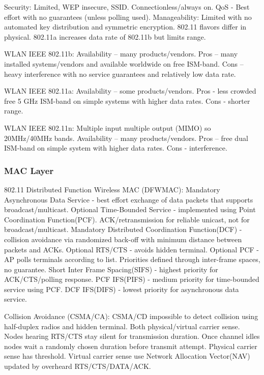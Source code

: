 \documentclass[9pt]{extarticle}
\begin{document}
\begin{multicols}{2}
Security: Limited, WEP insecure, SSID. Connectionless/always on. QoS - Best effort with no guarantees (unless polling used). Manageability: Limited with no automated key distribution and symmetric encryption. 802.11 flavors differ in physical. 802.11a increases data rate of 802.11b but limits range. 

WLAN IEEE 802.11b: Availability – many products/vendors. Pros – many installed systems/vendors and available worldwide on free ISM-band. Cons – heavy interference with no service guarantees and relatively low data rate.

WLAN IEEE 802.11a: Availability – some products/vendors. Pros - less crowded free 5 GHz ISM-band on simple systems with higher data rates. Cons - shorter range.

WLAN IEEE 802.11n: Multiple input multiple output (MIMO) so 20MHz/40MHz bands. Availability – many products/vendors. Pros – free dual ISM-band on simple system with higher data rates. Cons - interference.

\subsubsection{MAC Layer}

802.11 Distributed Function Wireless MAC (DFWMAC): Mandatory Asynchronous Data Service - best effort exchange of data packets  that supports broadcast/multicast. Optional Time-Bounded Service - implemented using Point Coordination Function(PCF). ACK/retransmission for reliable unicast, not for broadcast/multicast. Mandatory Distributed Coordination Function(DCF) - collision avoidance via randomized back-off with minimum distance between packets and ACKs. Optional RTS/CTS - avoids hidden terminal. Optional PCF - AP polls terminals according to list. Priorities defined through inter-frame spaces, no guarantee. Short Inter Frame Spacing(SIFS) - highest priority for ACK/CTS/polling response. PCF IFS(PIFS) - medium priority for time-bounded service using PCF. DCF IFS(DIFS) - lowest priority for asynchronous data service. 

Collision Avoidance (CSMA/CA): CSMA/CD impossible to detect collision using half-duplex radios and hidden terminal. Both physical/virtual carrier sense. Nodes hearing RTS/CTS stay silent for transmission duration. Once channel idles nodes wait a randomly chosen duration before transmit attempt. Physical carrier sense has threshold. Virtual carrier sense use Network Allocation Vector(NAV) updated by overheard
RTS/CTS/DATA/ACK.


\end{multicols}
\end{document}
